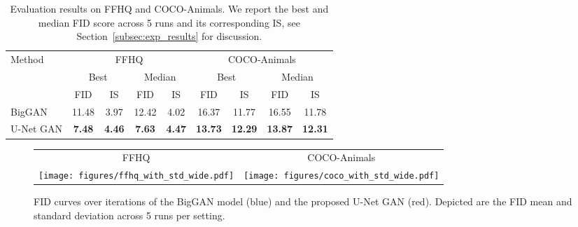 \documentclass[10pt,twocolumn,letterpaper]{article}
\begin{document}
\begin{table}
	\vspace{-1em}
	\setlength{\tabcolsep}{0.0em}
	\renewcommand{\arraystretch}{1.1}
	\centering

	
\hskip -0.15in		\begin{tabular}{lcc|cc||cc|cc}
		\multirow{3}{*}{\normalsize{} Method } & \multicolumn{4}{c}{\normalsize{} FFHQ}	& \multicolumn{4}{c}{\normalsize{}{COCO-Animals}} \tabularnewline
		
		
		& \multicolumn{2}{c|}{\normalsize{} Best } & \multicolumn{2}{c||}{\normalsize{} Median }  & \multicolumn{2}{c|}{\normalsize{} Best} & \multicolumn{2}{c}{\normalsize{} Median}\tabularnewline
	\small{}   & \small{} FID & \small{} IS 	& \small{} FID & \small{} IS  & \small{} FID  & \small{} IS  & \small{} FID & \small{} IS \tabularnewline
	
		\hline 	\hline
		\normalsize{} BigGAN \cite{Brock2019} & \normalsize{} 11.48 & \normalsize{} 3.97 & \normalsize{} 12.42 & \normalsize{} 4.02  & \normalsize{} 16.37  & \normalsize{} 11.77  & \normalsize{} 16.55  & \normalsize{} 11.78 \tabularnewline
		\normalsize{} U-Net GAN & \normalsize{} \textbf{7.48} & \normalsize{} \textbf{4.46}	& \normalsize{}  \textbf{7.63} & \normalsize{}  \textbf{4.47} &  \normalsize{} \textbf{13.73} &  \normalsize{} \textbf{12.29} & \normalsize{} \textbf{13.87}  & \normalsize{} \textbf{12.31} \tabularnewline
	\end{tabular}

	\vspace{-0.5em}
    \caption{Evaluation results on FFHQ and COCO-Animals. We report the best and median FID score across 5 runs and its corresponding IS, see Section~\ref{subsec:exp_results} for discussion.
    } \label{table:fid_overview} \vspace{-0.0em}
\end{table}
 \begin{figure}
\begin{centering}
\setlength{\tabcolsep}{0em}
\renewcommand{\arraystretch}{0}
\par\end{centering}
\begin{centering}
\vspace{-1em}
\hfill{}\begin{tabular}{@{}c@{}c@{}}
	FFHQ & COCO-Animals \\
\texttt{[image: figures/ffhq\_with\_std\_wide.pdf]}&
\texttt{[image: figures/coco\_with\_std\_wide.pdf]}
\end{tabular}\hfill{}
\par\end{centering}
\vspace{-0.5em}
\caption{\label{fig:fid_curves} FID curves over iterations of the BigGAN model (blue) and the proposed U-Net GAN (red). Depicted are the FID mean and standard deviation across 5 runs per setting.}	
\vspace{-1em}
\end{figure}
 
\end{document}
